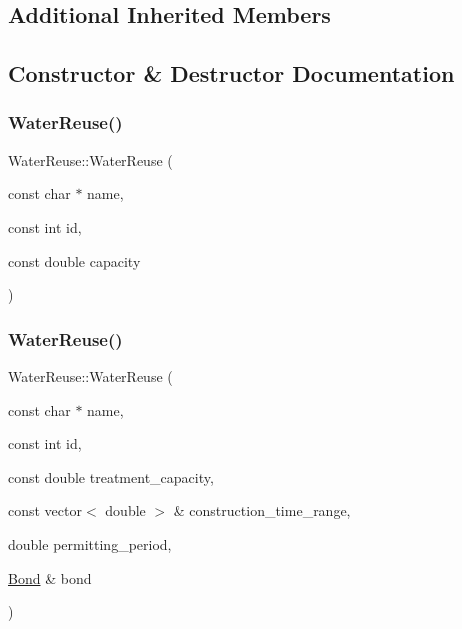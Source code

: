 \subsection*{Additional Inherited Members}


\subsection{Constructor \& Destructor Documentation}
\mbox{\label{classWaterReuse_a0493da65856f50fad2bc2d2c087f378f_a0493da65856f50fad2bc2d2c087f378f}} 
\subsubsection{\texorpdfstring{Water\+Reuse()}{WaterReuse()}\hspace{0.1cm}{\footnotesize\ttfamily [1/3]}}
{\footnotesize\ttfamily Water\+Reuse\+::\+Water\+Reuse (\begin{DoxyParamCaption}\item[{const char $\ast$}]{name,  }\item[{const int}]{id,  }\item[{const double}]{capacity }\end{DoxyParamCaption})}

\mbox{\label{classWaterReuse_a107ecd54d6fd705f0c31e57de21914e1_a107ecd54d6fd705f0c31e57de21914e1}} 
\subsubsection{\texorpdfstring{Water\+Reuse()}{WaterReuse()}\hspace{0.1cm}{\footnotesize\ttfamily [2/3]}}
{\footnotesize\ttfamily Water\+Reuse\+::\+Water\+Reuse (\begin{DoxyParamCaption}\item[{const char $\ast$}]{name,  }\item[{const int}]{id,  }\item[{const double}]{treatment\+\_\+capacity,  }\item[{const vector$<$ double $>$ \&}]{construction\+\_\+time\+\_\+range,  }\item[{double}]{permitting\+\_\+period,  }\item[{\mbox{\hyperlink{classBond}{Bond}} \&}]{bond }\end{DoxyParamCaption})}

